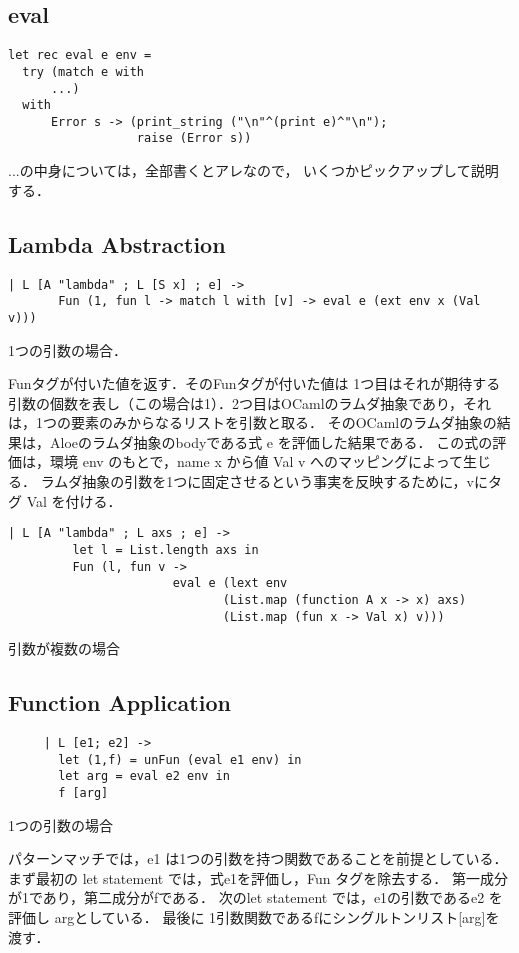 \documentclass[10pt,a4paper]{jarticle}
\theoremstyle{definition}
\begin{document}
\subsection{eval}

{\small
\begin{verbatim}
let rec eval e env =
  try (match e with
      ...)
  with
      Error s -> (print_string ("\n"^(print e)^"\n");
                  raise (Error s))
\end{verbatim}}

...の中身については，全部書くとアレなので，
いくつかピックアップして説明する．

\subsection{Lambda Abstraction}

{\small
\begin{verbatim}
| L [A "lambda" ; L [S x] ; e] ->
       Fun (1, fun l -> match l with [v] -> eval e (ext env x (Val v)))
\end{verbatim}}
1つの引数の場合．

Funタグが付いた値を返す．そのFunタグが付いた値は 1つ目はそれが期待する引数の個数を表し（この場合は1）．2つ目はOCamlのラムダ抽象であり，それは，1つの要素のみからなるリストを引数と取る．
そのOCamlのラムダ抽象の結果は，Aloeのラムダ抽象のbodyである式 e を評価した結果である．
この式の評価は，環境 env のもとで，name x から値 Val v へのマッピングによって生じる．
ラムダ抽象の引数を1つに固定させるという事実を反映するために，vにタグ Val を付ける．

{\small
\begin{verbatim}
| L [A "lambda" ; L axs ; e] ->
	     let l = List.length axs in
	     Fun (l, fun v ->
		               eval e (lext env
			                  (List.map (function A x -> x) axs)
			                  (List.map (fun x -> Val x) v)))
\end{verbatim}}
引数が複数の場合


\subsection{Function Application}

{\small
\begin{verbatim}
     | L [e1; e2] ->
       let (1,f) = unFun (eval e1 env) in
       let arg = eval e2 env in
       f [arg]
\end{verbatim}}
1つの引数の場合

パターンマッチでは，e1 は1つの引数を持つ関数であることを前提としている．
まず最初の let statement では，式e1を評価し，Fun タグを除去する．
第一成分が1であり，第二成分がfである．
次のlet statement では，e1の引数であるe2 を評価し argとしている．
最後に 1引数関数であるfにシングルトンリスト[arg]を渡す．
\end{document}
